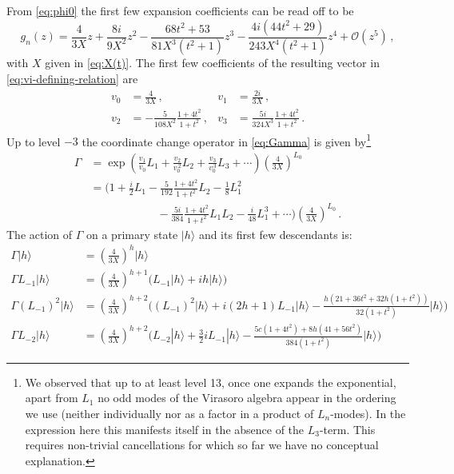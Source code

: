 \documentclass[11pt,a4paper]{article}
\numberwithin{equation}{section}
\begin{document}
\noindent 
From \eqref{eq:phi0} the first few expansion coefficients can be read off to be
%
\begin{equation}
    g_n(z) = \frac{4}{3X} z + \frac{8 i}{9 X^2}z^2 - \frac{68 t^2+53}{81 X^3(t^2+1)} z^3 -\frac{4i\left(44t^2+29\right)}{243 X^4(t^2+1)} z^4 + \mathcal{O}\left(z^5\right)\,,
\end{equation}
%
with $X$ given in \eqref{eq:X(t)}. The first few coefficients of the resulting vector in \eqref{eq:vi-defining-relation} are
%
\begin{align}
    v_0 &= \frac{4}{3X}\,, &v_1 &= \frac{2 i}{3 X}\,,
    \nonumber\\
    v_2 &= -\frac{5}{108 X^2} \frac{1+4t^2}{1+t^2}\,,& v_3 &= \frac{5 i}{324 X^3} \frac{1+4t^2}{1+t^2}\,.
\end{align}
%
Up to level $-3$ the coordinate change operator in \eqref{eq:Gamma} is given by\footnote{
  We observed that up to at least level 13, once one expands the exponential, apart from $L_1$ no odd modes of the Virasoro algebra appear in the ordering we use (neither individually nor as a factor in a product of $L_n$-modes). In the expression here this manifests itself in the absence of the $L_3$-term. This requires non-trivial cancellations for which so far we have no conceptual explanation. 
}
%
\begin{equation}\label{eq:Gamma_h}
\begin{split}
    \Gamma &= 
    \exp\!\left(\frac{v_1}{v_0} L_1 + \frac{v_2}{v_0^{\,2}} L_2 + \frac{v_3}{v_0^{\,3}} L_3 +\cdots\right) \left(\frac{4}{3X}\right)^{L_0} 
    \\
    &= \Big(1 + \frac{i}{2} L_1 - \frac{5}{192} \frac{1+4t^2}{1+t^2} L_2 - \frac{1}{8} L_1^2
    \\   
    &\qquad\qquad\qquad
    -\frac{5 i}{384}\frac{1+4t^2}{1+t^2} L_1 L_2 -\frac{i}{48} L_1^3 + \cdots\Big)
    \left(\frac{4}{3X}\right)^{L_0}
\,.
\end{split}
\end{equation}
%
The action of $\Gamma$ on a primary state $|h \rangle$ and its first few descendants is:
\begin{align}
    \Gamma |h \rangle &= \left(\frac{4}{3X}\right)^{\!h} |h \rangle
    \nonumber\\
    \Gamma L_{-1} |h \rangle &= \left(\frac{4}{3X}\right)^{\!h+1} \Big( L_{-1} |h \rangle + i h |h \rangle \Big)
    \nonumber\\
    \Gamma (L_{-1})^2 |h \rangle &= \left(\frac{4}{3X}\right)^{\!h+2} \Big( (L_{-1})^2 |h \rangle+ i(2h+1)L_{-1} |h \rangle - \frac{h (21 + 36 t^2 + 32 h (1 + t^2))}{32 (1 + t^2)} |h \rangle \Big)
    \nonumber\\
    \Gamma L_{-2} |h \rangle &= \left(\frac{4}{3X}\right)^{\!h+2} \Big( L_{-2} |h \rangle+ \tfrac32 i L_{-1} |h \rangle - \frac{5 c (1 + 4 t^2) + 8 h (41 + 56 t^2)}{384 (1 + t^2)} |h \rangle \Big)
\label{eq:Gamma-action-one-two-levels}
\end{align}
\end{document}
